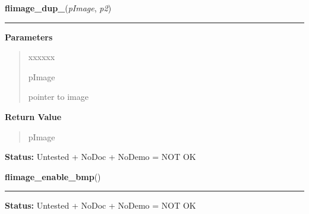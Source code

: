 \hspace{.8\funcindent}\begin{boxedminipage}{\funcwidth}

    \raggedright \textbf{flimage\_dup\_}(\textit{pImage}, \textit{p2})

    \vspace{-1.5ex}

    \rule{\textwidth}{0.5\fboxrule}
\setlength{\parskip}{2ex}
\setlength{\parskip}{1ex}
      \textbf{Parameters}
      \vspace{-1ex}

      \begin{quote}
        \begin{Ventry}{xxxxxx}

          \item[pImage]

          pointer to image

        \end{Ventry}

      \end{quote}

      \textbf{Return Value}
    \vspace{-1ex}

      \begin{quote}
      pImage

      \end{quote}

\textbf{Status:} Untested + NoDoc + NoDemo = NOT OK



    \end{boxedminipage}

    \label{xformslib:library:flimage_enable_bmp}

    \vspace{0.5ex}

\hspace{.8\funcindent}\begin{boxedminipage}{\funcwidth}

    \raggedright \textbf{flimage\_enable\_bmp}()

    \vspace{-1.5ex}

    \rule{\textwidth}{0.5\fboxrule}
\setlength{\parskip}{2ex}
\setlength{\parskip}{1ex}
\textbf{Status:} Untested + NoDoc + NoDemo = NOT OK



    \end{boxedminipage}


